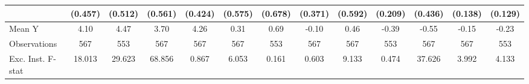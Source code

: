 {\begin{tabular}{l*{12}{c}}
            &     (0.457)         &     (0.512)         &     (0.561)         &     (0.424)         &     (0.575)         &     (0.678)         &     (0.371)         &     (0.592)         &     (0.209)         &     (0.436)         &     (0.138)         &     (0.129)         \\
\midrule
Mean Y      &        4.10         &        4.47         &        3.70         &        4.26         &        0.31         &        0.69         &       -0.10         &        0.46         &       -0.39         &       -0.55         &       -0.15         &       -0.23         \\
Observations&         567         &         553         &         567         &         567         &         567         &         553         &         567         &         567         &         553         &         567         &         567         &         553         \\
Exc. Inst. F-stat&      18.013         &      29.623         &      68.856         &       0.867         &       6.053         &       0.161         &       0.603         &       9.133         &       0.474         &      37.626         &       3.992         &       4.133         \\
\bottomrule
\end{tabular}
}
